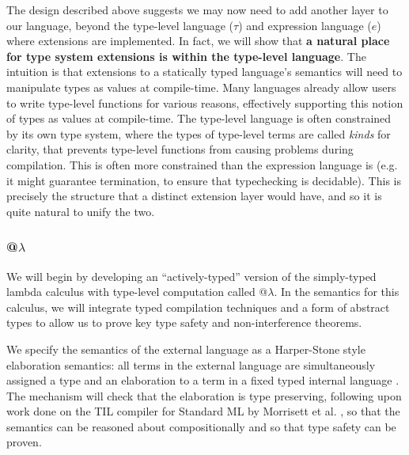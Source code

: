 The design described above suggests we may now need to add another layer to our language, beyond the type-level language ($\tau$) and expression language ($e$) where extensions are implemented. In fact, we will show that \textbf{a natural place for type system extensions is within the type-level language}. The intuition  is that extensions to a statically typed language's semantics will need to manipulate types as values at compile-time. Many languages already allow users to write type-level functions for various reasons, effectively supporting this notion of types as values at compile-time. The type-level language is often constrained by its own type system, where the types of type-level terms are called \emph{kinds} for clarity,  that prevents type-level functions from causing problems during compilation. This is often more constrained than the expression language is (e.g. it might guarantee termination, to ensure that typechecking is decidable). This is precisely the structure that a distinct extension layer would have, and so it is quite natural to unify the two.


\subsubsection{@$\lambda$}
We will begin by developing an ``actively-typed'' version of the simply-typed lambda calculus with type-level computation called @$\lambda$. In the semantics for this calculus, we will integrate typed compilation techniques and a form of abstract types to allow us to prove key type safety and non-interference theorems. 

We specify the semantics of the external language as a Harper-Stone style elaboration semantics: all terms in the external language are simultaneously assigned a type and an elaboration to a term in a fixed typed internal language \cite{HarperStone}.  The mechanism will check that the elaboration is type preserving, following upon work done on the TIL compiler for Standard ML by Morrisett et al. \cite{TIL}, so that the semantics can be reasoned about compositionally and so that type safety can be proven. 

